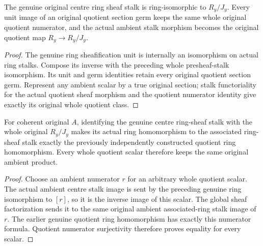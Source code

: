 \begin{theorem}
\label{hir:real-domain-actual-centre-ring-whole-sheaf-stalk}
\leanok
The genuine original centre ring sheaf stalk is ring-isomorphic to
$R_y/J_y$. Every unit image of an original quotient section germ keeps
the same whole original quotient numerator, and the actual ambient
stalk morphism becomes the original quotient map $R_y\to R_y/J_y$.
\end{theorem}
\begin{proof}
The genuine ring sheafification unit is internally an isomorphism on
actual ring stalks. Compose its inverse with the preceding whole
presheaf-stalk isomorphism. Its unit and germ identities retain every
original quotient section germ. Represent any ambient scalar by a true
original section; stalk functoriality for the actual quotient sheaf
morphism and the quotient numerator identity give exactly its original
whole quotient class.
\end{proof}

\begin{theorem}
\label{hir:real-domain-actual-centre-ring-sheaf-whole-action}
\leanok
For coherent original $A$, identifying the genuine centre ring-sheaf
stalk with the whole original $R_y/J_y$ makes its actual ring homomorphism
to the associated ring-sheaf stalk exactly the previously independently
constructed quotient ring homomorphism. Every whole quotient scalar
therefore keeps the same original ambient product.
\end{theorem}
\begin{proof}
Choose an ambient numerator $r$ for an arbitrary whole quotient scalar.
The actual ambient centre stalk image is sent by the preceding genuine
ring isomorphism to $[r]$, so it is the inverse image of this scalar.
The global sheaf factorization sends it to the same original ambient
associated-ring stalk image of $r$. The earlier genuine quotient ring
homomorphism has exactly this numerator formula. Quotient numerator
surjectivity therefore proves equality for every scalar.
\end{proof}
